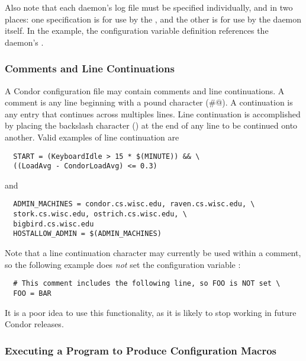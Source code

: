 Also note that each daemon's log file must be specified individually,
and in two places: one specification is for use by the ,
and the other is for use by the daemon itself.
In the example,
the   configuration variable
 definition references the
 daemon's .


\subsubsection{\label{sec:Other-Syntax}Comments and Line Continuations}

A Condor configuration file may contain comments and
line continuations.
A comment is any line beginning with a pound character (\verb@#@).
A continuation is any entry that continues across multiples lines.
Line continuation is accomplished by placing the backslash
character (\Bs) at the end of any line to be continued onto another.
Valid examples of line continuation are
\begin{verbatim}
  START = (KeyboardIdle > 15 * $(MINUTE)) && \
  ((LoadAvg - CondorLoadAvg) <= 0.3)
\end{verbatim}
and
\begin{verbatim}
  ADMIN_MACHINES = condor.cs.wisc.edu, raven.cs.wisc.edu, \
  stork.cs.wisc.edu, ostrich.cs.wisc.edu, \
  bigbird.cs.wisc.edu
  HOSTALLOW_ADMIN = $(ADMIN_MACHINES)
\end{verbatim}

Note that a line continuation character may currently be used within
a comment, so the following example does \emph{not} set the
configuration variable :
\begin{verbatim}
  # This comment includes the following line, so FOO is NOT set \
  FOO = BAR
\end{verbatim}
It is a poor idea to use this functionality, as it is likely to
stop working in future Condor releases.

\subsubsection{\label{sec:Program-Defined-Macros}Executing a Program to Produce Configuration Macros}

